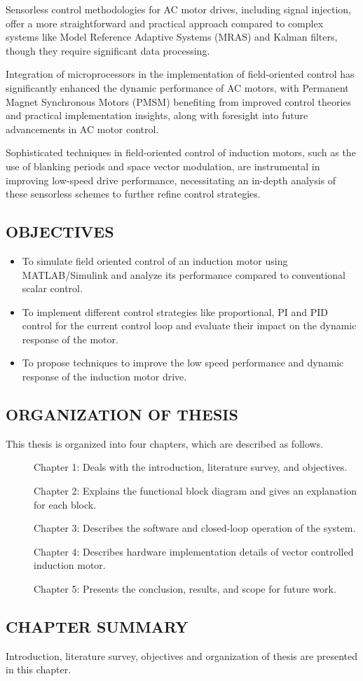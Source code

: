 Sensorless control methodologies for AC motor drives, including signal injection, offer a more straightforward and practical approach compared to complex systems like Model Reference Adaptive Systems (MRAS) and Kalman filters, though they require significant data processing.


Integration of microprocessors in the implementation of field-oriented control has significantly enhanced the dynamic performance of AC motors, with Permanent Magnet Synchronous Motors (PMSM) benefiting from improved control theories and practical implementation insights, along with foresight into future advancements in AC motor control.


Sophisticated techniques in field-oriented control of induction motors, such as the use of blanking periods and space vector modulation, are instrumental in improving low-speed drive performance, necessitating an in-depth analysis of these sensorless schemes to further refine control strategies.

\subsection{OBJECTIVES}
\begin{itemize}
	\item To simulate field oriented control of an induction motor using MATLAB/Simulink and analyze its performance compared to conventional scalar control.
	\item To implement different control strategies like proportional, PI and PID control for the current control loop and evaluate their impact on the dynamic response of the motor.

	\item To propose techniques to improve the low speed performance and dynamic response of the induction motor drive.
\end{itemize}

\subsection{ORGANIZATION OF THESIS}
\hspace{0.2in}This thesis is organized into four chapters, which are described as follows.

\begin{description}
	\item[] Chapter 1: Deals with the introduction, literature survey, and objectives.
	\item[] Chapter 2: Explains the functional block diagram and gives an explanation for each block.
	\item[] Chapter 3: Describes the software and closed-loop operation of the system.
	\item[] Chapter 4: Describes hardware implementation details of vector controlled induction motor.
	\item[] Chapter 5: Presents the conclusion, results, and scope for future work.
\end{description}

\subsection{CHAPTER SUMMARY}
\hspace{0.2in} Introduction, literature survey, objectives and organization of thesis are presented in this chapter.

\newpage